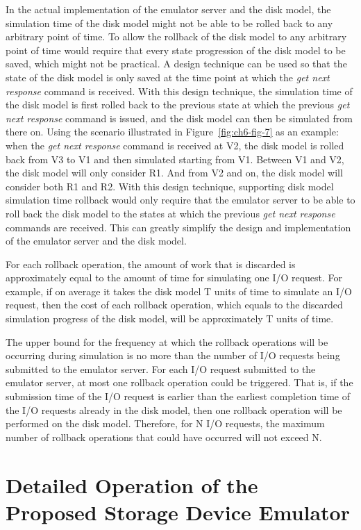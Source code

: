 In the actual implementation of the emulator server and the disk model, the simulation time of the disk model might not be able to be rolled back to any arbitrary point of time. To allow the rollback of the disk model to any arbitrary point of time would require that every state progression of the disk model to be saved, which might not be practical. A design technique can be used so that the state of the disk model is only saved at the time point at which the \textit{get next response} command is received. With this design technique, the simulation time of the disk model is first rolled back to the previous state at which the previous \textit{get next response} command is issued, and the disk model can then be simulated from there on. Using the scenario illustrated in Figure~\ref{fig:ch6-fig-7} as an example: when the \textit{get next response} command is received at V2, the disk model is rolled back from V3 to V1 and then simulated starting from V1. Between V1 and V2, the disk model will only consider R1. And from V2 and on, the disk model will consider both R1 and R2. With this design technique, supporting disk model simulation time rollback would only require that the emulator server to be able to roll back the disk model to the states at which the previous \textit{get next response} commands are received. This can greatly simplify the design and implementation of the emulator server and the disk model.

For each rollback operation, the amount of work that is discarded is approximately equal to the amount of time for simulating one I/O request. For example, if on average it takes the disk model T units of time to simulate an I/O request, then the cost of each rollback operation, which equals to the discarded simulation progress of the disk model, will be approximately T units of time.

The upper bound for the frequency at which the rollback operations will be occurring during simulation is no more than the number of I/O requests being submitted to the emulator server. For each I/O request submitted to the emulator server, at most one rollback operation could be triggered. That is, if the submission time of the I/O request is earlier than the earliest completion time of the I/O requests already in the disk model, then one rollback operation will be performed on the disk model. Therefore, for N I/O requests, the maximum number of rollback operations that could have occurred will not exceed N.
\section{Detailed Operation of the Proposed Storage Device Emulator}
\label{sec:ch6-6.4}

